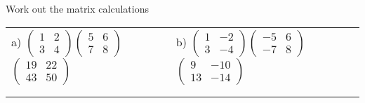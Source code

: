 \documentclass[fontsize=12pt]{scrartcl}
\begin{document}
\newpage
Work out the matrix calculations
\newline
\newline
\begin{tabular}{p{9cm}p{9cm}}
a) $\begin{pmatrix}1&2\\3&4 \end{pmatrix} \begin{pmatrix}5&6\\7&8 \end{pmatrix}$
 \quad $\begin{pmatrix}19&22\\43&50\end{pmatrix}$
&b) $\begin{pmatrix}1&-2\\3&-4 \end{pmatrix} \begin{pmatrix}-5&6\\-7&8 \end{pmatrix}$
 \quad $\begin{pmatrix}9&-10\\13&-14\end{pmatrix}$
\\\\\\

\end{tabular}
\end{document}
